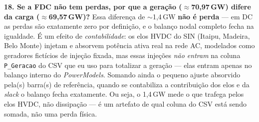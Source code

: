 \documentclass[11pt,a4paper]{article}
\begin{document}
\textbf{18. Se a FDC não tem perdas, por que a geração ($\approx$70{,}97\,GW) difere da carga ($\approx$69{,}57\,GW)?} Essa diferença de $\sim$1{,}4\,GW \textbf{não é perda} --- em DC as perdas são exatamente zero por definição, e o balanço nodal completo fecha na igualdade. É um efeito de \emph{contabilidade}: os elos HVDC do SIN (Itaipu, Madeira, Belo Monte) injetam e absorvem potência ativa real na rede AC, modelados como geradores fictícios de injeção fixada, mas essas injeções \emph{não entram} na coluna \texttt{P\_Geracao} do CSV que eu uso para totalizar a geração --- elas entram apenas no balanço interno do \textit{PowerModels}. Somando ainda o pequeno ajuste absorvido pela(s) barra(s) de referência, quando se contabiliza a contribuição dos elos e da \textit{slack} o balanço fecha exatamente. Ou seja, o 1{,}4\,GW mede o que trafega pelos elos HVDC, não dissipação --- é um artefato de qual coluna do CSV está sendo somada, não uma perda física.
\end{document}
